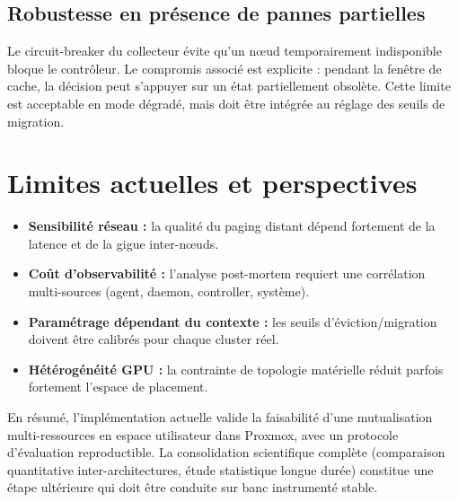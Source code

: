 \subsection{Robustesse en présence de pannes partielles}

Le circuit-breaker du collecteur évite qu’un nœud temporairement indisponible bloque le contrôleur. Le compromis associé est explicite : pendant la fenêtre de cache, la décision peut s’appuyer sur un état partiellement obsolète. Cette limite est acceptable en mode dégradé, mais doit être intégrée au réglage des seuils de migration.

\section{Limites actuelles et perspectives}
\label{sec:discussion-limites}

\begin{itemize}
    \item \textbf{Sensibilité réseau :} la qualité du paging distant dépend fortement de la latence et de la gigue inter-nœuds.
    \item \textbf{Coût d’observabilité :} l’analyse post-mortem requiert une corrélation multi-sources (agent, daemon, controller, système).
    \item \textbf{Paramétrage dépendant du contexte :} les seuils d’éviction/migration doivent être calibrés pour chaque cluster réel.
    \item \textbf{Hétérogénéité GPU :} la contrainte de topologie matérielle réduit parfois fortement l’espace de placement.
\end{itemize}

En résumé, l’implémentation actuelle valide la faisabilité d’une mutualisation multi-ressources en espace utilisateur dans Proxmox, avec un protocole d’évaluation reproductible. La consolidation scientifique complète (comparaison quantitative inter-architectures, étude statistique longue durée) constitue une étape ultérieure qui doit être conduite sur banc instrumenté stable.
